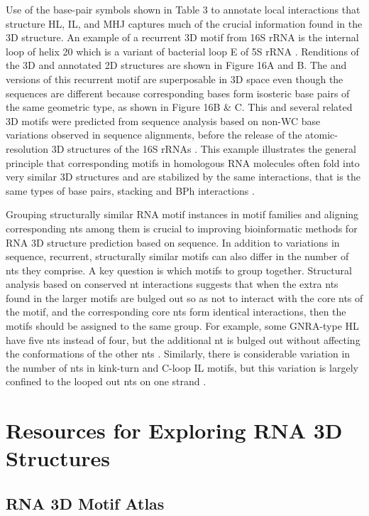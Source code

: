 Use of the base-pair symbols shown in Table 3 to annotate local interactions
that structure HL, IL, and MHJ captures much of the crucial information found in
the 3D structure. An example of a recurrent 3D motif from 16S rRNA is the
internal loop of helix 20 which is a variant of bacterial loop E of 5S rRNA
\cite{Leontis1998a}. Renditions of the 3D and annotated 2D structures are shown
in Figure 16A and B. The \EC{} and \TT{} versions of this recurrent motif are
superposable in 3D space even though the sequences are different because
corresponding bases form isosteric base pairs of the same geometric type, as
shown in Figure 16B \& C. This and several related 3D motifs were predicted from
sequence analysis based on non-WC base variations observed in sequence
alignments, before the release of the atomic-resolution 3D structures of the 16S
rRNAs \cite{Leontis1998, Leontis2002e}. This example illustrates the general
principle that corresponding motifs in homologous RNA molecules often fold into
very similar 3D structures and are stabilized by the same interactions, that is
the same types of base pairs, stacking and BPh interactions \cite{Petrov2013}.

Grouping structurally similar RNA motif instances in motif families and aligning
corresponding nts among them is crucial to improving bioinformatic methods for
RNA 3D structure prediction based on sequence. In addition to variations in
sequence, recurrent, structurally similar motifs can also differ in the number
of nts they comprise. A key question is which motifs to group together.
Structural analysis based on conserved nt interactions suggests that when the
extra nts found in the larger motifs are bulged out so as not to interact with
the core nts of the motif, and the corresponding core nts form identical
interactions, then the motifs should be assigned to the same group. For example,
some GNRA-type HL have five nts instead of four, but the additional nt is bulged
out without affecting the conformations of the other nts \cite{Nasalean2009b}.
Similarly, there is considerable variation in the number of nts in kink-turn and
C-loop IL motifs, but this variation is largely confined to the looped out nts
on one strand \cite{Lescoute2005}.

\section{Resources for Exploring RNA 3D Structures}

\subsection{RNA 3D Motif Atlas}

